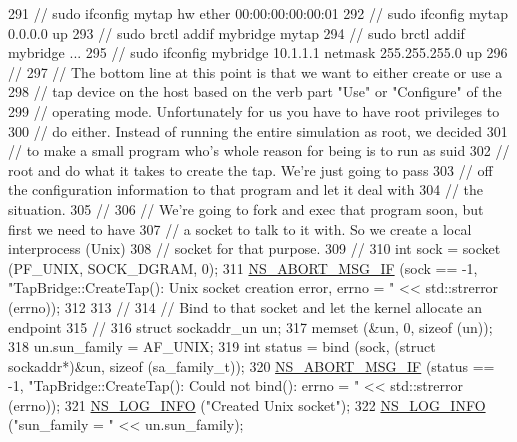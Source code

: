 \begin{DoxyCode}
291   \textcolor{comment}{//   sudo ifconfig mytap hw ether 00:00:00:00:00:01}
292   \textcolor{comment}{//   sudo ifconfig mytap 0.0.0.0 up}
293   \textcolor{comment}{//   sudo brctl addif mybridge mytap}
294   \textcolor{comment}{//   sudo brctl addif mybridge ...}
295   \textcolor{comment}{//   sudo ifconfig mybridge 10.1.1.1 netmask 255.255.255.0 up}
296   \textcolor{comment}{//}
297   \textcolor{comment}{// The bottom line at this point is that we want to either create or use a }
298   \textcolor{comment}{// tap device on the host based on the verb part "Use" or "Configure" of the }
299   \textcolor{comment}{// operating mode.  Unfortunately for us you have to have root privileges to}
300   \textcolor{comment}{// do either.  Instead of running the entire simulation as root, we decided }
301   \textcolor{comment}{// to make a small program who's whole reason for being is to run as suid }
302   \textcolor{comment}{// root and do what it takes to create the tap.  We're just going to pass }
303   \textcolor{comment}{// off the configuration information to that program and let it deal with}
304   \textcolor{comment}{// the situation.}
305   \textcolor{comment}{//}
306   \textcolor{comment}{// We're going to fork and exec that program soon, but first we need to have }
307   \textcolor{comment}{// a socket to talk to it with.  So we create a local interprocess (Unix) }
308   \textcolor{comment}{// socket for that purpose.}
309   \textcolor{comment}{//}
310   \textcolor{keywordtype}{int} sock = socket (PF\_UNIX, SOCK\_DGRAM, 0);
311   \hyperlink{group__fatal_ga6653324225bc139e46deea177614ceee}{NS\_ABORT\_MSG\_IF} (sock == -1, \textcolor{stringliteral}{"TapBridge::CreateTap(): Unix socket creation error, errno = 
      "} << std::strerror (errno));
312 
313   \textcolor{comment}{//}
314   \textcolor{comment}{// Bind to that socket and let the kernel allocate an endpoint}
315   \textcolor{comment}{//}
316   \textcolor{keyword}{struct }sockaddr\_un un;
317   memset (&un, 0, \textcolor{keyword}{sizeof} (un));
318   un.sun\_family = AF\_UNIX;
319   \textcolor{keywordtype}{int} status = bind (sock, (\textcolor{keyword}{struct} sockaddr*)&un, \textcolor{keyword}{sizeof} (sa\_family\_t));
320   \hyperlink{group__fatal_ga6653324225bc139e46deea177614ceee}{NS\_ABORT\_MSG\_IF} (status == -1, \textcolor{stringliteral}{"TapBridge::CreateTap(): Could not bind(): errno = "} << 
      std::strerror (errno));
321   \hyperlink{group__logging_gafbd73ee2cf9f26b319f49086d8e860fb}{NS\_LOG\_INFO} (\textcolor{stringliteral}{"Created Unix socket"});
322   \hyperlink{group__logging_gafbd73ee2cf9f26b319f49086d8e860fb}{NS\_LOG\_INFO} (\textcolor{stringliteral}{"sun\_family = "} << un.sun\_family);

\end{DoxyCode}
